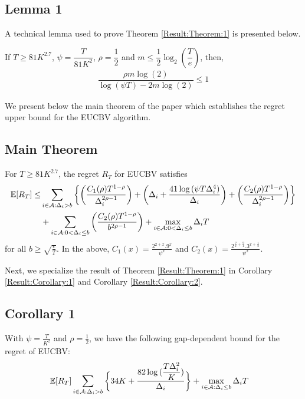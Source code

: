 \subsection{Lemma 1}

A technical lemma used to prove Theorem \ref{Result:Theorem:1} is presented below.

\begin{lemma}
\label{results:Lemma:1}
If $T\geq 81K^{2.7}$, $\psi=\dfrac{T}{81 K^2}$, $\rho=\dfrac{1}{2}$ and $m\leq \dfrac{1}{2} \log_2(\dfrac{T}{e}) $, then,
\begin{align*}
\dfrac{\rho m \log(2)}{\log(\psi T) - 2m\log( 2)} \leq 1
\end{align*}
\end{lemma}

We present below the main theorem of the paper which establishes the regret upper bound for the EUCBV  algorithm. 

\subsection{Main Theorem}
\begin{theorem}
\label{Result:Theorem:1}
For $T\geq 81 K^{2.7}$, the regret $R_T$ for EUCBV satisfies
\begin{align*}
 \mathbb{E} [R_{T}] \leq &\sum\limits_{i\in \mathcal{A} :\Delta_{i} > b}\bigg\lbrace\bigg(\dfrac{C_{1}(\rho)T^{1-\rho}}{\Delta_{i}^{2\rho -1}}\bigg) + \bigg(\Delta_{i}+\dfrac{41\log{(\psi  T\Delta_{i}^{4})}}{\Delta_{i}}\bigg) + \bigg(\dfrac{ C_{2}(\rho) T^{1-\rho}}{\Delta_{i}^{2\rho-1}} \bigg)\bigg \rbrace \\ 
  & +\sum\limits_{i\in \mathcal{A} :0 < \Delta_{i}\leq b}\bigg(\dfrac{C_{2}(\rho)T^{1-\rho}}{b^{2\rho -1}} \bigg) + \max_{i\in \mathcal{A} :0 < \Delta_{i}\leq b}\Delta_{i}T
\end{align*}
for all $b\geq\sqrt{\frac{e}{T}}$. In the above, $C_1(x) = \frac{2^{2+x}.9^{x}}{\psi^{x}}$ and $C_2(x) = \frac{2^{\frac{\rho}{2}+\frac{9}{4}}.3^{x+\frac{1}{2}}}{\psi^{x}}$.
\end{theorem}

Next, we specialize the result of Theorem \ref{Result:Theorem:1} in Corollary \ref{Result:Corollary:1} and Corollary \ref{Result:Corollary:2}.

\subsection{Corollary 1}
\begin{corollary}
\label{Result:Corollary:1}
With $\psi=\frac{T}{K^2}$ and $\rho=\frac{1}{2}$, we have the following gap-dependent bound for the regret of EUCBV:
\begin{align*}
\mathbb{E} [R_T] & \sum_{i\in \mathcal{A}:\Delta_{i} > b}\bigg\lbrace 34 K + \dfrac{82\log{(\dfrac{T\Delta_{i}^{2}}{ K})}}{\Delta_{i}}\bigg\rbrace 
 + \max\limits_{i\in \mathcal{A}:\Delta_{i}\leq b}\Delta_{i}T 
	\end{align*} 
\end{corollary}

